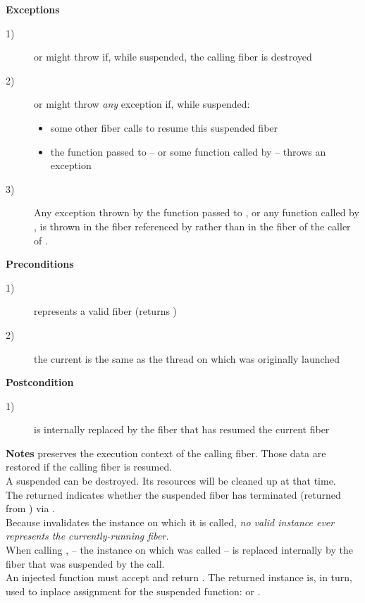 {\bfseries Exceptions}
\begin{description}
    \item[1)] \resume or \resumewith might throw \unwindex if, while suspended,
              the calling fiber is destroyed
    \item[2)] \resume or \resumewith might throw \emph{any} exception if,
              while suspended:
              \begin{itemize}
                  \item some other fiber calls \resumewith to resume this
                        suspended fiber
                  \item the function  passed to \resumewith -- or some
                        function called by  -- throws an exception
              \end{itemize}
    \item[3)] Any exception thrown by the function  passed to
              \resumewith, or any function called by , is thrown in the
              fiber referenced by  rather than in the fiber of
              the caller of \resumewith.
\end{description}

{\bfseries Preconditions}
\begin{description}
    \item[1)]  represents a valid fiber (\opbool returns )
    \item[2)] the current  is the same as the thread on which
               was originally launched
\end{description}

{\bfseries Postcondition}
\begin{description}
    \item[1)]  is internally replaced by the fiber that has resumed
            the current fiber
\end{description}

{\bfseries Notes}
\newline
\resume preserves the execution context of the calling fiber. Those data are
restored if the calling fiber is resumed.\\
A suspended  can be destroyed. Its resources will be cleaned
up at that time.\\
The returned  indicates whether the suspended fiber has
terminated (returned from \entryfn) via \opbool.\\
Because \resume invalidates the instance on which it is called, \emph{no valid
\fiber instance ever represents the currently-running fiber.}\\
When calling \resume,  -- the instance on which \resume was called --
is replaced internally by the fiber that was suspended by the \resume call.\\
An injected function  must accept  and
return \fiber. The returned \fiber instance is, in turn, used to inplace
assignment for the suspended function: \resume or \resumewith.


